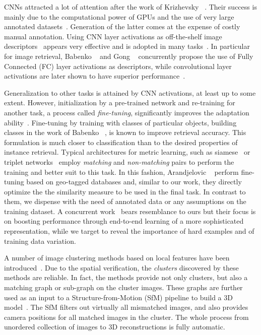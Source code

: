 \documentclass[runningheads]{llncs}
\begin{document}
CNNs attracted a lot of attention after the work of Krizhevsky \etal~\cite{KSH12}. Their success is mainly due to the computational power of GPUs and the use of very large annotated datasets~\cite{RDSK+15}. 
Generation of the latter comes at the expense of costly manual annotation. Using CNN layer activations as off-the-shelf image descriptors~\cite{DJVO+13,RASC14} appears very effective and is adopted in many tasks~\cite{GDDM14,IMKG+14,GWGL14}. 
In particular for image retrieval, Babenko \etal~\cite{BSCL14} and Gong \etal~\cite{GWGL14} concurrently propose the use of Fully Connected (FC) layer activations as descriptors, while convolutional layer activations are later shown to have superior performance~\cite{RSMC14,BL15,KMO15,TSJ16}. 

Generalization to other tasks \cite{ARSM+14} is attained by CNN activations, at least up to some extent.
However, initialization by a pre-trained network and re-training for another task, a process called \emph{fine-tuning}, significantly improves the adaptation ability~\cite{ZDGD14,OBLS14}. 
Fine-tuning by training with classes of particular objects, \eg building classes in the work of Babenko \etal~\cite{BSCL14}, is known to improve retrieval accuracy. 
This formulation is much closer to classification than to the desired properties of instance retrieval. 
Typical architectures for metric learning, such as siamese~\cite{CHL05,HCL06,HLT14} or triplet networks~\cite{WSLT+14,SKP15,HA15} employ \emph{matching} and \emph{non-matching} pairs to perform the training and better suit to this task.
In this fashion, Arandjelovic \etal~\cite{AGTPS15} perform fine-tuning based on geo-tagged databases and, similar to our work, they directly optimize the the similarity measure to be used in the final task. 
In contrast to them, we dispense with the need of annotated data or any assumptions on the training dataset. 
A concurrent work~\cite{GARL16} bears resemblance to ours but their focus is on boosting performance through end-to-end learning of a more sophisticated representation, while we target to reveal the importance of hard examples and of training data variation. 

A number of image clustering methods based on local features have been introduced~\cite{CM10a,WL13,PSZ11}. 
Due to the spatial verification, the \emph{clusters} discovered by these methods are reliable. 
In fact, the methods provide not only clusters, but also a matching graph or sub-graph on the cluster images. 
These graphs are further used as an input to a Structure-from-Motion (SfM) pipeline to build a 3D model~\cite{SRCF15}. 
The SfM filters out virtually all mismatched images, and also provides camera positions for all matched images in the cluster. 
The whole process from unordered collection of images to 3D reconstructions is fully automatic.
\end{document}
